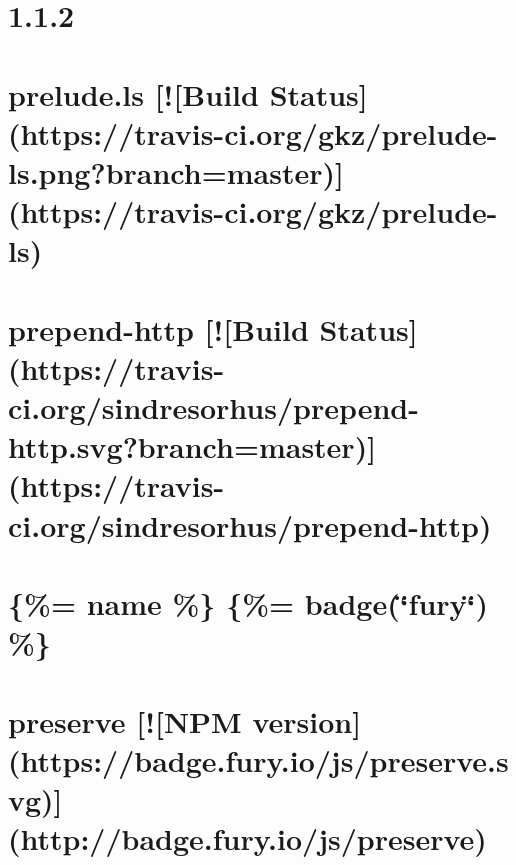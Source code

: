 \documentclass[twoside]{book}
\newcommand{\+}{\discretionary{\mbox{\scriptsize$\hookleftarrow$}}{}{}}
\begin{document}
\chapter{1.1.2}
\label{md__c_1_workspace_demo_src_main_script_node_modules_prelude-ls__c_h_a_n_g_e_l_o_g}

\chapter{prelude.\+ls \mbox{[}!\mbox{[}Build Status\mbox{]}(https\+://travis-\/ci.org/gkz/prelude-\/ls.png?branch=master)\mbox{]}(https\+://travis-\/ci.org/gkz/prelude-\/ls)}
\label{md__c_1_workspace_demo_src_main_script_node_modules_prelude-ls__r_e_a_d_m_e}

\chapter{prepend-\/http \mbox{[}!\mbox{[}Build Status\mbox{]}(https\+://travis-\/ci.org/sindresorhus/prepend-\/http.svg?branch=master)\mbox{]}(https\+://travis-\/ci.org/sindresorhus/prepend-\/http)}
\label{md__c_1_workspace_demo_src_main_script_node_modules_prepend-http_readme}

\chapter{\{\%= name \%\} \{\%= badge(\char`\"{}fury\char`\"{}) \%\}}
\label{md__c_1_workspace_demo_src_main_script_node_modules_preserve__8verb}

\chapter{preserve \mbox{[}!\mbox{[}N\+PM version\mbox{]}(https\+://badge.fury.\+io/js/preserve.svg)\mbox{]}(http\+://badge.fury.\+io/js/preserve)}
\label{md__c_1_workspace_demo_src_main_script_node_modules_preserve__r_e_a_d_m_e}

\end{document}
